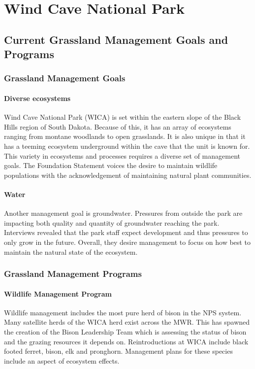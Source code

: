 \section{Wind Cave National Park}

\subsection{Current Grassland Management Goals and Programs}

\subsubsection{Grassland Management Goals}

\paragraph{Diverse ecosystems}
Wind Cave National Park (WICA) is set
within the eastern slope of the Black Hills region of South Dakota.
Because of this, it has an array of ecosystems ranging from montane
woodlands to open grasslands. It is also unique in that it has a teeming
ecosystem underground within the cave that the unit is known for. This
variety in ecosystems and processes requires a diverse set of management
goals. The Foundation Statement voices the desire to maintain wildlife
populations with the acknowledgement of maintaining natural plant
communities.

\paragraph{Water}
Another management goal is groundwater. Pressures from
outside the park are impacting both quality and quantity of groundwater
reaching the park. Interviews revealed that the park staff expect
development and thus pressures to only grow in the future. Overall, they
desire management to focus on how best to maintain the natural state of
the ecosystem.

\subsubsection{Grassland Management Programs}

\paragraph{Wildlife Management Program}
Wildlife management includes the
most pure herd of bison in the NPS system. Many satellite herds of the
WICA herd exist across the MWR. This has spawned the creation of the
Bison Leadership Team which is assessing the status of bison and the
grazing resources it depends on. Reintroductions at WICA include black
footed ferret, bison, elk and pronghorn. Management plans for these
species include an aspect of ecosystem effects.

